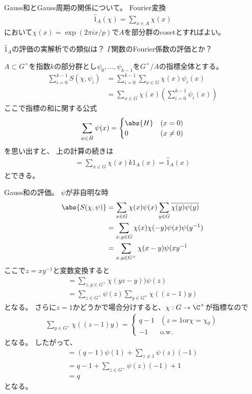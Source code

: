 \documentclass{jsarticle}
\begin{document}
Gauss和とGauss周期の関係について。
Fourier変換
\begin{align*}
\hat{1}_A(\chi)=\sum_{x\in A}\chi(x)
\end{align*}
において$\chi(x)=\exp(2\pi ix/p)$で$A$を部分群のcosetとすればよい。

$\hat{1}_A$の評価の実解析での類似は？
$\Gamma$関数のFourier係数の評価とか？

\begin{prop}
$A\subset G^\times$を指数$k$の部分群とし$\psi_0,\ldots,\psi_{k-1}$を$G^\times/A$の指標全体とする。
\begin{align*}
\sum^{k-1}_{i=0}S(\chi,\psi_i)&=\sum^{k-1}_{i=0}\sum_{x\in G}\chi(x)\psi_i(x)\\
&=\sum_{x\in G}\chi(x)(\sum_{i=0}^{k-1}\psi_i(x))
\end{align*}
ここで指標の和に関する公式
\begin{align*}
\sum_{\psi\in\hat{H}}\psi(x)=\begin{cases}\abs{H}&(x=0)\\0&(x\neq0)\end{cases}
\end{align*}
を思い出すと、
上の計算の続きは
\begin{align*}
=\sum_{x\in G}\chi(x)k1_A(x)=\hat{1}_A(x)
\end{align*}
とできる。
\end{prop}

\begin{prop}
Gauss和の評価。
$\psi$が非自明な時
\begin{align*}
\abs{S(\chi,\psi)}&=\sum_{x\in G}\chi(x)\psi(x)\sum_{y\in G}\overline{\chi(y)}\overline{\psi(y)}\\
&=\sum_{x,y\in G}\chi(x)\chi(-y)\psi(x)\psi(y^{-1})\\
&=\sum_{x,y\in G^\times}\chi(x-y)\psi(xy^{-1}
\end{align*}
ここで$z=xy^{-1}$と変数変換すると
\begin{align*}
=\sum_{z,y\in G^\times}\chi(yz-y))\psi(z)\\
=\sum_{z\in G^\times}\psi(z)\sum_{y\in G^\times}\chi((z-1)y)
\end{align*}
となる。
さらに$z=1$かどうかで場合分けすると、$\chi:G\to\C^\times$が指標なので
\begin{align*}
\sum_{y\in G^\times}\chi((z-1)y)=\begin{cases}q-1&(z=1 \mbox{or} \chi=\chi_0)\\-1&\mbox{o.w.}\end{cases}
\end{align*}
となる。
したがって、
\begin{align*}
=(q-1)\psi(1)+\sum_{z\neq1}\psi(z)(-1)\\
=q-1+\sum_{z\in G^\times}\psi(z)(-1)+1\\
=q
\end{align*}
となる。
\end{prop}
\end{document}
